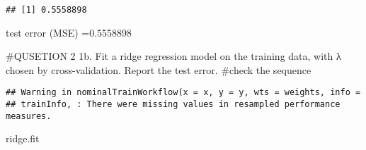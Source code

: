 \documentclass[]{article}
\newenvironment{Shaded}{\begin{snugshade}}{\end{snugshade}}
\newcommand{\DataTypeTok}[1]{\textcolor[rgb]{0.13,0.29,0.53}{#1}}
\newcommand{\DecValTok}[1]{\textcolor[rgb]{0.00,0.00,0.81}{#1}}
\newcommand{\KeywordTok}[1]{\textcolor[rgb]{0.13,0.29,0.53}{\textbf{#1}}}
\newcommand{\NormalTok}[1]{#1}
\newcommand{\OperatorTok}[1]{\textcolor[rgb]{0.81,0.36,0.00}{\textbf{#1}}}
\newcommand{\StringTok}[1]{\textcolor[rgb]{0.31,0.60,0.02}{#1}}
\begin{document}
\begin{verbatim}
## [1] 0.5558898
\end{verbatim}

test error (MSE) =0.5558898

\#QUSETION 2 1b. Fit a ridge regression model on the training data, with
λ chosen by cross-validation. Report the test error. \#check the
sequence

\begin{Shaded}
\end{Shaded}

\begin{verbatim}
## Warning in nominalTrainWorkflow(x = x, y = y, wts = weights, info =
## trainInfo, : There were missing values in resampled performance measures.
\end{verbatim}

\begin{Shaded}
\begin{Highlighting}[]
\NormalTok{ridge.fit}
\end{Highlighting}
\end{Shaded}
\end{document}
